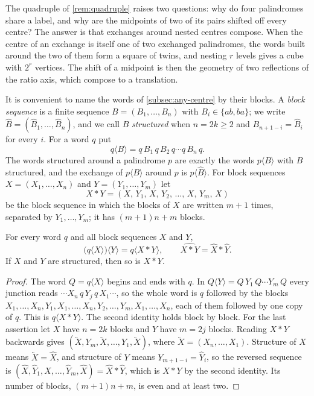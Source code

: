 The quadruple of \cref{rem:quadruple} raises two questions: why do four palindromes share a
label, and why are the midpoints of two of its pairs shifted off every centre? The answer is that
exchanges around nested centres compose. When the centre of an exchange is itself one of two
exchanged palindromes, the words built around the two of them form a square of twins, and nesting
$r$ levels gives a cube with $2^r$ vertices. The shift of a midpoint is then the geometry of two
reflections of the ratio axis, which compose to a translation.

It is convenient to name the words of \cref{subsec:any-centre} by their blocks. A \emph{block
sequence} is a finite sequence $B=(B_1,\dots,B_n)$ with $B_i\in\{ab,ba\}$; we write
$\widehat B=(\widehat B_1,\dots,\widehat B_n)$, and we call $B$ \emph{structured} when $n=2k\geqslant2$
and $B_{n+1-i}=\widehat B_i$ for every $i$. For a word $q$ put
$$
 q\langle B\rangle=q\,B_1\,q\,B_2\,q\cdots q\,B_n\,q .
$$
The words structured around a palindrome $p$ are exactly the words $p\langle B\rangle$ with $B$
structured, and the exchange of $p\langle B\rangle$ around $p$ is $p\langle\widehat B\rangle$. For
block sequences $X=(X_1,\dots,X_n)$ and $Y=(Y_1,\dots,Y_m)$ let
$$
 X\ast Y=(X,\,Y_1,\,X,\,Y_2,\,\dots,\,X,\,Y_m,\,X)
$$
be the block sequence in which the blocks of $X$ are written $m+1$ times, separated by
$Y_1,\dots,Y_m$; it has $(m+1)n+m$ blocks.

\begin{lemma}
\label{lem:nested-reading}
For every word $q$ and all block sequences $X$ and $Y$,
$$
 \bigl(q\langle X\rangle\bigr)\langle Y\rangle=q\langle X\ast Y\rangle,
 \qquad \widehat{X\ast Y}=\widehat X\ast\widehat Y .
$$
If $X$ and $Y$ are structured, then so is $X\ast Y$.
\end{lemma}

\begin{proof}
The word $Q=q\langle X\rangle$ begins and ends with $q$. In $Q\langle Y\rangle=Q\,Y_1\,Q\cdots Y_m\,Q$
every junction reads $\cdots X_n\,q\,Y_j\,q\,X_1\cdots$, so the whole word is $q$ followed by the
blocks $X_1,\dots,X_n,Y_1,X_1,\dots,X_n,Y_2,\dots,Y_m,X_1,\dots,X_n$, each of them followed by one
copy of $q$. This is $q\langle X\ast Y\rangle$. The second identity holds block by block. For the
last assertion let $X$ have $n=2k$ blocks and $Y$ have $m=2j$ blocks. Reading $X\ast Y$ backwards
gives $(\overleftarrow X,Y_m,\overleftarrow X,\dots,Y_1,\overleftarrow X)$, where
$\overleftarrow X=(X_n,\dots,X_1)$. Structure of $X$ means $\overleftarrow X=\widehat X$, and
structure of $Y$ means $Y_{m+1-i}=\widehat Y_i$, so the reversed sequence is
$(\widehat X,\widehat Y_1,\widehat X,\dots,\widehat Y_m,\widehat X)=\widehat X\ast\widehat Y$, which
is $\widehat{X\ast Y}$ by the second identity. Its number of blocks, $(m+1)n+m$, is even and at
least two.
\end{proof}

